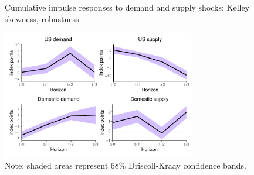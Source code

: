 \documentclass[12pt, a4paper]{article}
\begin{document}
\begin{figure}[H]
    \centering    
    \caption{Cumulative impulse responses to demand and supply shocks: Kelley skewness, robustness.}  
    \label{fig:kelley_robust}
    \includegraphics[width=0.75\textwidth]{Figures/kelley_demand_supply_LP_robust.pdf}
    \centering \caption*{Note: shaded areas represent 68\% Driscoll-Kraay confidence bands.}
\end{figure}
\newpage
\end{document}
